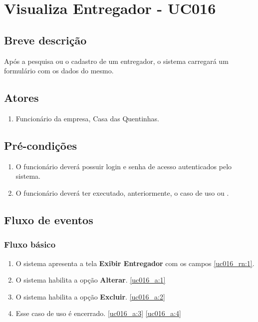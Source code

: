\chapter{Visualiza Entregador - UC016} \label{uc016}

\section{Breve descrição}

Após a pesquisa ou o cadastro de um entregador, o sistema carregará um formulário com os dados do mesmo.

\section{Atores}

\begin{enumerate}
	\item Funcionário da empresa, Casa das Quentinhas.
\end{enumerate}

\section{Pré-condições}

\begin{enumerate}
	\item O funcionário deverá possuir login e senha de acesso autenticados pelo sistema.
	\item O funcionário deverá ter executado, anteriormente, o caso de uso  ou .
\end{enumerate}

\section{Fluxo de eventos}

\subsection{Fluxo básico}

\begin{enumerate}[label=P\arabic*]
	\item O sistema apresenta a tela \textbf{Exibir Entregador} com os campos \ref{uc016_rn:1}. \label{uc016_p:1}
	\item O sistema habilita a opção \textbf{Alterar}. \label{uc016_p:2}\ref{uc016_a:1} 
	\item O sistema habilita a opção \textbf{Excluir}. \label{uc016_p:3}\ref{uc016_a:2}
	\item Esse caso de uso é encerrado. \label{uc016_p:4}\ref{uc016_a:3} \ref{uc016_a:4}
\end{enumerate}

